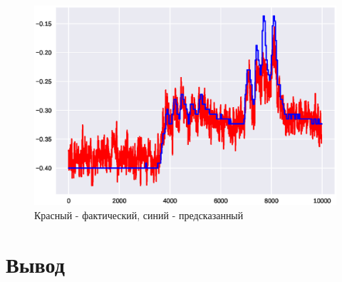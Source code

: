 \documentclass[12pt,twoside]{article}
\begin{document}
\begin{figure}[h]
  \includegraphics[width=\linewidth]{1.eps}
  \caption{Красный - фактический, синий - предсказанный}
  \label{fig:results}
\end{figure}
    
\section{Вывод}



\end{document}
